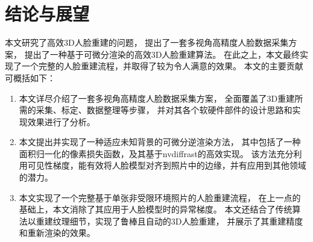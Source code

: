\documentclass{scutmaster}
\begin{document}








{
\backmatter
\chapter{结论与展望}
\label{chap:conclusion}

本文研究了高效3D人脸重建的问题，
提出了一套多视角高精度人脸数据采集方案，
提出了一种基于可微分渲染的高效3D人脸重建算法。
在此之上，本文最终实现了一个完整的人脸重建流程，并取得了较为令人满意的效果。
本文的主要贡献可概括如下：
\begin{enumerate}
\item 本文详尽介绍了一套多视角高精度人脸数据采集方案，
全面覆盖了3D重建所需的采集、标定、数据整理等步骤，
并对其各个软硬件部件的设计思路和实现效果进行了分析。
\item 本文提出并实现了一种适应未知背景的可微分逆渲染方法，
其中包括了一种面积归一化的像素损失函数，及其基于nvdiffrast的高效实现。
该方法充分利用可见性梯度，能有效将人脸模型对齐到照片中的边缘，并有应用到其他领域的潜力。
\item 本文实现了一个完整基于单张非受限环境照片的人脸重建流程，
在上一点的基础上，本文消除了其应用于人脸模型时的异常梯度。
本文还结合了传统算法以重建纹理细节，实现了鲁棒且自动的3D人脸重建，
并展示了其重建精度和重新渲染的效果。
\end{enumerate}

}
\end{document}
